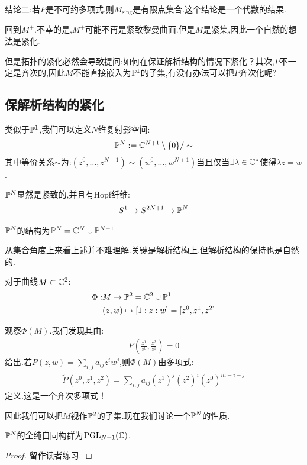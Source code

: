 结论二:若$P$是不可约多项式,则$M_{\mathrm{sing}}$是有限点集合.这个结论是一个代数的结果.

回到$M^+$.不幸的是,$M^+$可能不再是紧致黎曼曲面.但是$M$是紧集,因此一个自然的想法是紧化.

但是拓扑的紧化必然会导致提问:如何在保证解析结构的情况下紧化？其次,$P$不一定是齐次的,因此$M$不能直接嵌入为$\mathbb{P}^1$的子集,有没有办法可以把$P$齐次化呢?
\subsection*{保解析结构的紧化}
类似于$\mathbb{P}^1$,我们可以定义$N$维复射影空间:
\begin{align*}
	\mathbb{P}^N:=\mathbb{C}^{N+1}\setminus \{0\}/\sim
\end{align*}
其中等价关系$\sim$为:$(z^0,\dots,z^{N+1})\sim (w^0,\dots,w^{N+1})$当且仅当$\exists \lambda \in \mathbb{C}^*$使得$\lambda z=w$.

$\mathbb{P}^N$显然是紧致的,并且有Hopf纤维:
\begin{align*}
	S^1 \to S^{2N+1} \to \mathbb{P}^N
\end{align*}

\begin{proposition}
	$\mathbb{P}^N$的结构为$\mathbb{P}^N=\mathbb{C}^N\cup \mathbb{P}^{N-1}$
\end{proposition}
从集合角度上来看上述并不难理解.关键是解析结构上.但解析结构的保持也是自然的.

对于曲线$M\subset \mathbb{C}^2$:
\begin{align*}
	\Phi:&M \to \mathbb{P}^2=\mathbb{C}^2 \cup \mathbb{P}^1\\
&    (z,w) \mapsto [1:z:w]=[z^0,z^1,z^2]
\end{align*}

观察$\Phi(M)$.我们发现其由:
\begin{align*}
	P(\frac{z^1}{z^0},\frac{z^2}{z^0})=0
\end{align*}
给出.若$P(z,w)=\sum_{i,j}a_{ij}z^iw^j$,则$\Phi(M)$由多项式:
\begin{align*}
	\tilde{P}(z^0,z^1,z^2)=\sum_{i,j}a_{ij}(z^1)^j(z^2)^i(z^0)^{m-i-j}
\end{align*}
定义.这是一个齐次多项式！

因此我们可以把$M$视作$\mathbb{P}^2$的子集.现在我们讨论一个$\mathbb{P}^N$的性质.

\begin{proposition}
	$\mathbb{P}^N$的全纯自同构群为$\mathrm{PGL}_{N+1}(\mathbb{C})$.
\end{proposition}
\begin{proof}
	留作读者练习.
\end{proof}
